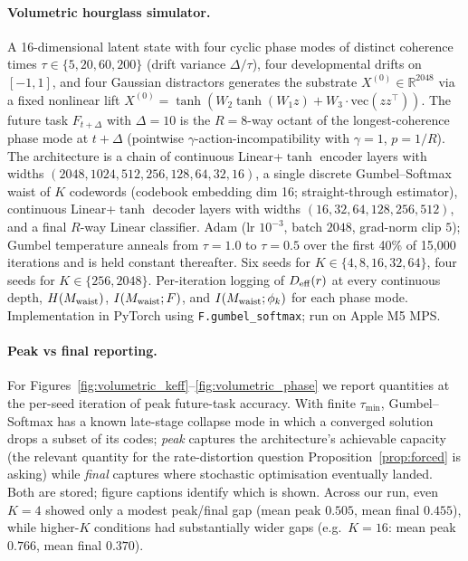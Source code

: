 \documentclass[12pt]{article}
\theoremstyle{definition}
\newcommand{\R}{\mathbb{R}}
\begin{document}
\paragraph{Volumetric hourglass simulator.} A 16-dimensional latent state with four cyclic phase modes of distinct coherence times $\tau\in\{5,20,60,200\}$ (drift variance $\Delta/\tau$), four developmental drifts on $[-1,1]$, and four Gaussian distractors generates the substrate $X^{(0)}\in\R^{2048}$ via a fixed nonlinear lift $X^{(0)} = \tanh(W_2 \tanh(W_1 z) + W_3 \cdot \mathrm{vec}(zz^\top))$. The future task $F_{t+\Delta}$ with $\Delta=10$ is the $R=8$-way octant of the longest-coherence phase mode at $t+\Delta$ (pointwise $\gamma$-action-incompatibility with $\gamma=1$, $p=1/R$). The architecture is a chain of continuous Linear+$\tanh$ encoder layers with widths $(2048,1024,512,256,128,64,32,16)$, a single discrete Gumbel--Softmax waist of $K$ codewords (codebook embedding dim 16; straight-through estimator), continuous Linear+$\tanh$ decoder layers with widths $(16,32,64,128,256,512)$, and a final $R$-way Linear classifier. Adam (lr $10^{-3}$, batch $2048$, grad-norm clip $5$); Gumbel temperature anneals from $\tau=1.0$ to $\tau=0.5$ over the first 40\% of 15{,}000 iterations and is held constant thereafter. Six seeds for $K\in\{4,8,16,32,64\}$, four seeds for $K\in\{256,2048\}$. Per-iteration logging of $D_{\rm eff}(r)$ at every continuous depth, $H(M_{\rm waist})$, $I(M_{\rm waist};F)$, and $I(M_{\rm waist};\phi_k)$ for each phase mode. Implementation in PyTorch using \texttt{F.gumbel\_softmax}; run on Apple M5 MPS.

\paragraph{Peak vs final reporting.} For Figures~\ref{fig:volumetric_keff}--\ref{fig:volumetric_phase} we report quantities at the per-seed iteration of peak future-task accuracy. With finite $\tau_{\min}$, Gumbel--Softmax has a known late-stage collapse mode in which a converged solution drops a subset of its codes; \emph{peak} captures the architecture's achievable capacity (the relevant quantity for the rate-distortion question Proposition~\ref{prop:forced} is asking) while \emph{final} captures where stochastic optimisation eventually landed. Both are stored; figure captions identify which is shown. Across our run, even $K=4$ showed only a modest peak/final gap (mean peak $0.505$, mean final $0.455$), while higher-$K$ conditions had substantially wider gaps (e.g.\ $K=16$: mean peak $0.766$, mean final $0.370$).
\end{document}
